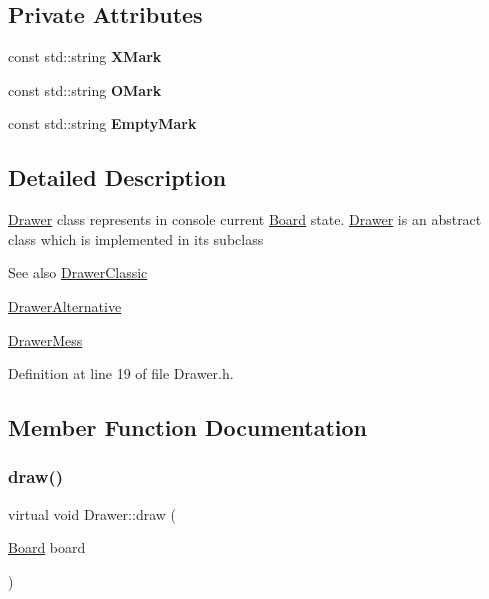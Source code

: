 \subsection*{Private Attributes}
\begin{DoxyCompactItemize}
\item 
\mbox{\label{classDrawer_a86db125a08ba0e79d545542a69fde9d3}} 
const std\+::string {\bfseries X\+Mark}
\item 
\mbox{\label{classDrawer_a007403c532527c21334e81e214109676}} 
const std\+::string {\bfseries O\+Mark}
\item 
\mbox{\label{classDrawer_a673b951b13d86a6d46bde89029f149b3}} 
const std\+::string {\bfseries Empty\+Mark}
\end{DoxyCompactItemize}


\subsection{Detailed Description}
\hyperlink{classDrawer}{Drawer} class represents in console current \hyperlink{classBoard}{Board} state. \hyperlink{classDrawer}{Drawer} is an abstract class which is implemented in its subclass \begin{DoxySeeAlso}{See also}
\hyperlink{classDrawerClassic}{Drawer\+Classic} 

\hyperlink{classDrawerAlternative}{Drawer\+Alternative} 

\hyperlink{classDrawerMess}{Drawer\+Mess} 
\end{DoxySeeAlso}


Definition at line 19 of file Drawer.\+h.



\subsection{Member Function Documentation}
\mbox{\label{classDrawer_afe75fce45596f02f01514322ebd57c8c}} 
\subsubsection{\texorpdfstring{draw()}{draw()}}
{\footnotesize\ttfamily virtual void Drawer\+::draw (\begin{DoxyParamCaption}\item[{\hyperlink{classBoard}{Board}}]{board }\end{DoxyParamCaption})\hspace{0.3cm}{\ttfamily [pure virtual]}}

